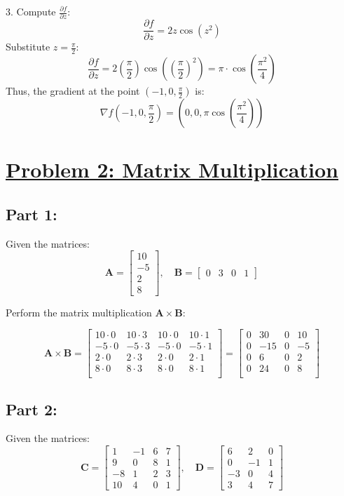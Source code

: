 \documentclass[12pt]{article}
\begin{document}
3. Compute \(\frac{\partial f}{\partial z}\):
\[
  \frac{\partial f}{\partial z} = 2z \cos(z^2)
\]
Substitute \(z = \frac{\pi}{2}\):
\[
  \frac{\partial f}{\partial z} = 2\left(\frac{\pi}{2}\right) \cos\left(\left(\frac{\pi}{2}\right)^2\right) = \pi \cdot \cos\left(\frac{\pi^2}{4}\right)
\]
Thus, the gradient at the point \((-1, 0, \frac{\pi}{2})\) is:
\[
  \nabla f(-1, 0, \frac{\pi}{2}) = (0, 0, \pi \cos(\frac{\pi^2}{4}))
\]

\section*{\underline{Problem 2: Matrix Multiplication}}

\subsection*{Part 1:}
Given the matrices:
\[
  \mathbf{A} = \begin{bmatrix} 10 \\ -5 \\ 2 \\ 8 \end{bmatrix}, \quad
  \mathbf{B} = \begin{bmatrix} 0 & 3 & 0 & 1 \end{bmatrix}
\]

Perform the matrix multiplication \(\mathbf{A} \times \mathbf{B}\):

\[
  \mathbf{A} \times \mathbf{B} = \begin{bmatrix}
    10 \cdot 0 & 10 \cdot 3 & 10 \cdot 0 & 10 \cdot 1 \\
    -5 \cdot 0 & -5 \cdot 3 & -5 \cdot 0 & -5 \cdot 1 \\
    2 \cdot 0  & 2 \cdot 3  & 2 \cdot 0  & 2 \cdot 1  \\
    8 \cdot 0  & 8 \cdot 3  & 8 \cdot 0  & 8 \cdot 1  \\
  \end{bmatrix}
  =
  \begin{bmatrix}
    0 & 30  & 0 & 10 \\
    0 & -15 & 0 & -5 \\
    0 & 6   & 0 & 2  \\
    0 & 24  & 0 & 8  \\
  \end{bmatrix}
\]

\subsection*{Part 2:}
Given the matrices:
\[
  \mathbf{C} = \begin{bmatrix}
    1  & -1 & 6 & 7 \\
    9  & 0  & 8 & 1 \\
    -8 & 1  & 2 & 3 \\
    10 & 4  & 0 & 1
  \end{bmatrix}, \quad
  \mathbf{D} = \begin{bmatrix}
    6  & 2  & 0 \\
    0  & -1 & 1 \\
    -3 & 0  & 4 \\
    3  & 4  & 7
  \end{bmatrix}
\]
\end{document}
